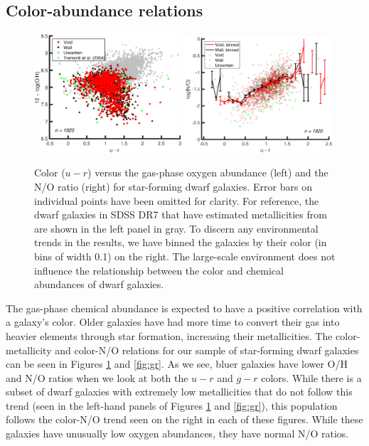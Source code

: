 \subsection{Color-abundance relations}

\begin{figure}
    \centering
    \includegraphics[width=0.49\textwidth]{Images/Paper3/ur_OH_1sig_I06relations_dwarf+T04_SF_t3_dust}
    \includegraphics[width=0.49\textwidth]{Images/Paper3/ur_NO_1sig_I06relations_dwarf_SF_t3_dust_scatterURbin}
    \caption[$u-r$ versus O/H and N/O for star-forming dwarf galaxies]{Color 
    ($u-r$) versus the gas-phase oxygen abundance (left) and the N/O ratio 
    (right) for star-forming dwarf galaxies.  Error bars on individual points 
    have been omitted for clarity.  For reference, the dwarf galaxies in SDSS 
    DR7 that have estimated metallicities from \cite{Tremonti04} are shown in 
    the left panel in gray.  To discern any environmental trends in the results, 
    we have binned the galaxies by their color (in bins of width 0.1) on the 
    right.  The large-scale environment does not influence the relationship 
    between the color and chemical abundances of dwarf galaxies.}
    \label{fig:ur_P3}
\end{figure}

The gas-phase chemical abundance is expected to have a positive correlation with 
a galaxy's color.  Older galaxies have had more time to convert their gas into 
heavier elements through star formation, increasing their metallicities.  The 
color-metallicity and color-N/O relations for our sample of star-forming dwarf 
galaxies can be seen in Figures \ref{fig:ur_P3} and \ref{fig:gr}.  As we see, 
bluer galaxies have lower O/H and N/O ratios when we look at both the $u-r$ and 
$g-r$ colors.  While there is a subset of dwarf galaxies with extremely low 
metallicities that do not follow this trend (seen in the left-hand panels of 
Figures \ref{fig:ur_P3} and \ref{fig:gr}), this population follows the color-N/O 
trend seen on the right in each of these figures.  While these galaxies have 
unusually low oxygen abundances, they have normal N/O ratios.

